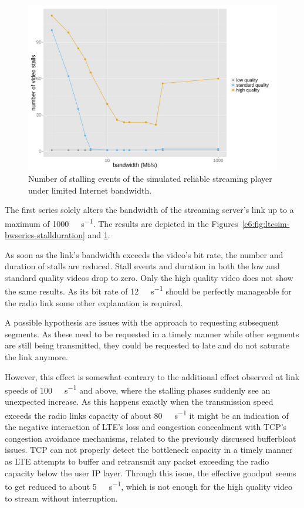 \begin{figure}[htb]
	\centering
	\includegraphics[width=1.0\textwidth]{images/R-ltesim-bwseries-numstalls.pdf}
	\caption{Number of stalling events of the simulated reliable streaming player under limited Internet bandwidth.}
\label{c6:fig:ltesim-bwseries-numstalls}
\end{figure}

The first series solely alters the bandwidth of the streaming server's link up to a maximum of \SI{1000}{\mega\bit\per\second}. The results are depicted in the Figures~\ref{c6:fig:ltesim-bwseries-stallduration} and \ref{c6:fig:ltesim-bwseries-numstalls}.

As soon as the link's bandwidth exceeds the video's bit rate, the number and duration of stalls are reduced. Stall events and duration in both the low and standard quality videos drop to zero. Only the high quality video does not show the same results. As its bit rate of \SI{12}{\mega\bit\per\second} should be perfectly manageable for the radio link some other explanation is required. 

A possible hypothesis are issues with the approach to requesting subsequent segments. As these need to be requested in a timely manner while other segments are still being transmitted, they could be requested to late and do not saturate the link anymore. 

However, this effect is somewhat contrary to the additional effect observed at link speeds of \SI{100}{\mega\bit\per\second} and above, where the stalling phases suddenly see an unexpected increase. As this happens exactly when the transmission speed exceeds the radio links capacity of about \SI{80}{\mega\bit\per\second} it might be an indication of the negative interaction of \gls{LTE}'s loss and congestion concealment with \gls{TCP}'s congestion avoidance mechanisms, related to the previously discussed bufferbloat issues. \gls{TCP} can not properly detect the bottleneck capacity in a timely manner as \gls{LTE} attempts to buffer and retransmit any packet exceeding the radio capacity below the user \gls{IP} layer. Through this issue, the effective goodput seems to get reduced to about \SI{5}{\mega\bit\per\second}, which is not enough for the high quality video to stream without interruption.

